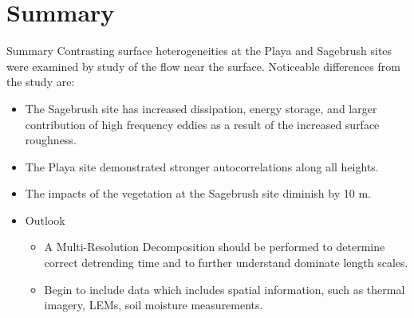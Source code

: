 \documentclass{beamer}
\begin{document}
\section*{Summary}

\begin{frame}{Summary}
	Contrasting surface heterogeneities at the Playa and Sagebrush sites were examined by study of the flow near the surface. Noticeable differences from the study are:  
  \begin{itemize}
  \item
    The Sagebrush site \alert{has increased dissipation, energy storage, and larger contribution of high frequency eddies} as a result of the increased surface roughness.
  \item
    The Playa site demonstrated \alert{stronger autocorrelations along all heights}.
  \item 
	  The impacts of the vegetation at the Sagebrush site \alert{diminish by 10 m.}
  \end{itemize}
  
  \begin{itemize}
  \item
    Outlook
    \begin{itemize}
    \item
      A Multi-Resolution Decomposition should be performed to determine correct detrending time and to further understand dominate length scales. 
    \item
      Begin to include data which includes spatial information, such as thermal imagery, LEMs, soil moisture measurements.  
    \end{itemize}
  \end{itemize}
\end{frame}



\end{document}
